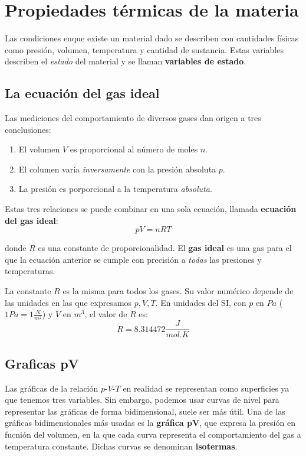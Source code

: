 \documentclass[12pt]{article}
\begin{document}
  \section{Propiedades térmicas de la materia}
  Las condiciones enque existe un material dado se describen con cantidades físicas como presión, volumen, temperatura y cantidad de sustancia. Estas variables describen el \textit{estado} del material y se llaman \textbf{variables de estado}.

  \subsection{La ecuación del gas ideal}
  Las mediciones del comportamiento de diversos gases dan origen a tres conclusiones:
  \begin{enumerate}[1.]
    \item El volumen $ V $ es proporcional al número de moles $ n $.

    \item El columen varía \textit{inversamente} con la presión absoluta $ p $.

    \item La presión es porporcional a la temperatura \textit{absoluta}.
  \end{enumerate}

  Estas tres relaciones se puede combinar en una sola ecuación, llamada \textbf{ecuación del gas ideal}:
  \[
  pV = nRT
  \]

  donde $ R $ es una constante de proporcionalidad. El \textbf{gas ideal} es una gas para el que la ecuación anterior se cumple con precisión a \textit{todas} las presiones y temperaturas. 

  La constante $ R $ es la misma para todos los gases. Su valor numérico depende de las unidades en las que expresamos $ p, V, T $. En unidades del SI, con $ p $ en $ Pa $ ($ 1Pa = 1\frac{N}{m^{2}} $) y $ V $ en $ m^{3} $, el valor de $ R $ es:
  \[
  R = 8.314472\frac{J}{mol.K}
  \]

  \subsection{Graficas pV}
  Las gráficas de la relación $ p $-$ V $-$ T $ en realidad se representan como superficies ya que tenemos tres variables. Sin embargo, podemos usar curvas de nivel para representar las gráficas de forma bidimensional, suele ser más útil. Una de las gráficas bidimensionales más usadas es la \textbf{gráfica pV}, que expresa la presión en fucnión del volumen, en la que cada curva representa el comportamiento del gas a temperatura constante. Dichas curvas se denominan \textbf{isotermas}.
\end{document}
